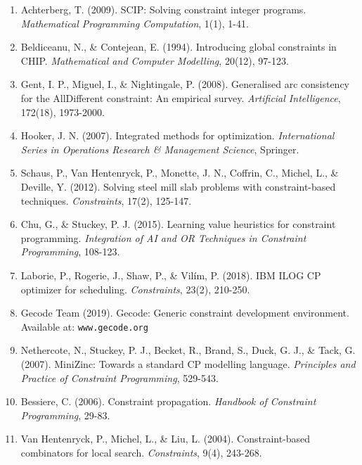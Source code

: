 \documentclass[12pt,a4paper]{article}
\begin{document}
\begin{enumerate}
\item Achterberg, T. (2009). SCIP: Solving constraint integer programs. \textit{Mathematical Programming Computation}, 1(1), 1-41.

\item Beldiceanu, N., \& Contejean, E. (1994). Introducing global constraints in CHIP. \textit{Mathematical and Computer Modelling}, 20(12), 97-123.

\item Gent, I. P., Miguel, I., \& Nightingale, P. (2008). Generalised arc consistency for the AllDifferent constraint: An empirical survey. \textit{Artificial Intelligence}, 172(18), 1973-2000.

\item Hooker, J. N. (2007). Integrated methods for optimization. \textit{International Series in Operations Research \& Management Science}, Springer.

\item Schaus, P., Van Hentenryck, P., Monette, J. N., Coffrin, C., Michel, L., \& Deville, Y. (2012). Solving steel mill slab problems with constraint-based techniques. \textit{Constraints}, 17(2), 125-147.

\item Chu, G., \& Stuckey, P. J. (2015). Learning value heuristics for constraint programming. \textit{Integration of AI and OR Techniques in Constraint Programming}, 108-123.

\item Laborie, P., Rogerie, J., Shaw, P., \& Vilím, P. (2018). IBM ILOG CP optimizer for scheduling. \textit{Constraints}, 23(2), 210-250.

\item Gecode Team (2019). Gecode: Generic constraint development environment. Available at: \texttt{www.gecode.org}

\item Nethercote, N., Stuckey, P. J., Becket, R., Brand, S., Duck, G. J., \& Tack, G. (2007). MiniZinc: Towards a standard CP modelling language. \textit{Principles and Practice of Constraint Programming}, 529-543.

\item Bessiere, C. (2006). Constraint propagation. \textit{Handbook of Constraint Programming}, 29-83.

\item Van Hentenryck, P., Michel, L., \& Liu, L. (2004). Constraint-based combinators for local search. \textit{Constraints}, 9(4), 243-268.


\end{enumerate}
\end{document}
